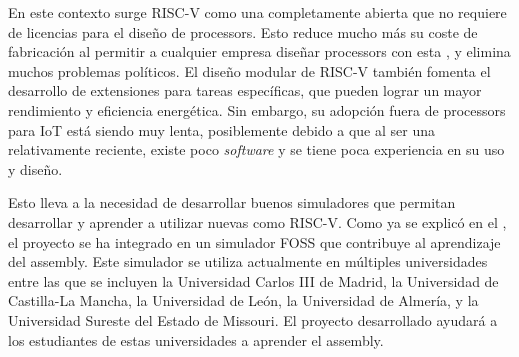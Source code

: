 En este contexto surge RISC-V como una  completamente
abierta que no requiere de licencias para el diseño de \glspl{processor}. Esto
reduce mucho más su coste de fabricación al permitir a cualquier empresa diseñar
\glspl{processor} con esta , y elimina muchos
problemas políticos. El diseño modular de RISC-V también fomenta el desarrollo
de extensiones para tareas específicas, que pueden lograr un mayor rendimiento y
eficiencia energética. Sin embargo, su adopción fuera de \glspl{processor} para
\gls{IoT} está siendo muy lenta, posiblemente debido a que al ser una
 relativamente reciente, existe poco
\textit{software} y se tiene poca experiencia en su uso y diseño.

Esto lleva a la necesidad de desarrollar buenos simuladores que permitan
desarrollar y aprender a utilizar nuevas  como
RISC-V. Como ya se explicó en el , el proyecto se ha
integrado en un simulador \gls{FOSS} que contribuye al aprendizaje del
\gls{assembly}. Este simulador se utiliza actualmente en múltiples
universidades entre las que se incluyen la Universidad Carlos III de Madrid, la
Universidad de Castilla-La Mancha, la Universidad de León, la Universidad de
Almería, y la Universidad Sureste del Estado de Missouri. El proyecto
desarrollado ayudará a los estudiantes de estas universidades a aprender el
\gls{assembly}.
